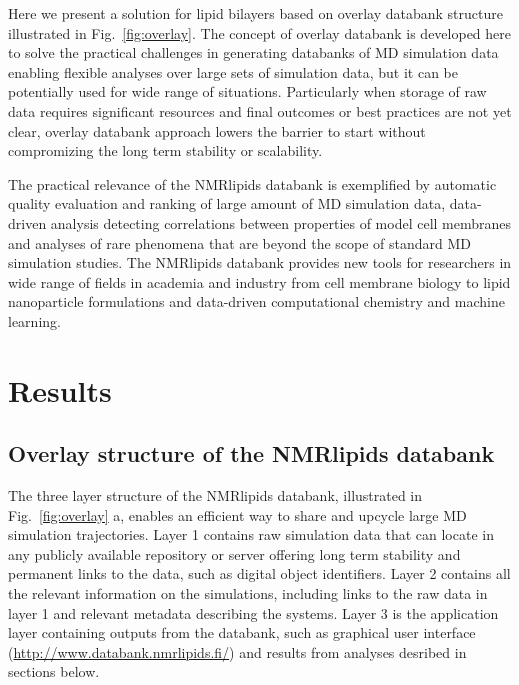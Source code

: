 \documentclass[fleqn,10pt]{wlscirep}
\begin{document}
Here we present a solution for lipid bilayers based on overlay databank structure illustrated in Fig.~\ref{fig:overlay}.  The concept of overlay databank is developed here to solve the practical challenges in generating databanks of MD simulation data enabling flexible analyses over large sets of simulation data, but it can be  potentially used for wide range of situations. Particularly when storage of raw data requires significant resources and final outcomes or best practices are not yet clear, overlay databank approach lowers the barrier to start without compromizing the long term stability or scalability.

The practical relevance of the NMRlipids databank is exemplified by automatic quality evaluation and ranking of large amount of MD simulation data, data-driven analysis detecting correlations between properties of model cell membranes and analyses of rare phenomena that are beyond the scope of standard MD simulation studies. The NMRlipids databank provides new tools for researchers in wide range of fields in academia and industry from cell membrane biology to lipid nanoparticle formulations and data-driven computational chemistry and machine learning. 


\section{Results}

\subsection{Overlay structure of the NMRlipids databank}
The three layer structure of the NMRlipids databank, illustrated in Fig.~\ref{fig:overlay} a, enables an efficient way to share and upcycle large MD simulation trajectories.  Layer 1 contains raw simulation data that can locate in any publicly available repository or server offering long term stability and permanent links to the data, such as digital object identifiers. Layer 2 contains all the relevant information on the simulations, including links to the raw data in layer 1 and relevant metadata describing the systems. Layer 3 is the application layer containing outputs from the databank, such as graphical user interface (\url{http://www.databank.nmrlipids.fi/}) and results from analyses desribed in sections below.   
\end{document}
